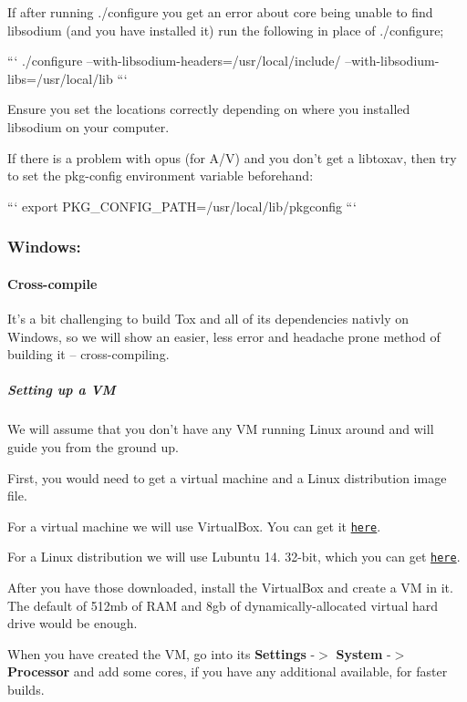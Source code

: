 If after running ./configure you get an error about core being unable to find libsodium (and you have installed it) run the following in place of ./configure;

``` ./configure --with-\/libsodium-\/headers=/usr/local/include/ --with-\/libsodium-\/libs=/usr/local/lib ```

Ensure you set the locations correctly depending on where you installed libsodium on your computer.

If there is a problem with opus (for A/\+V) and you don't get a libtoxav, then try to set the pkg-\/config environment variable beforehand\+:

``` export P\+K\+G\+\_\+\+C\+O\+N\+F\+I\+G\+\_\+\+P\+A\+T\+H=/usr/local/lib/pkgconfig ```

\label{_windows}%
 \subsubsection*{Windows\+:}

\label{_windows-cross-compile}%


\paragraph*{Cross-\/compile}

It's a bit challenging to build Tox and all of its dependencies nativly on Windows, so we will show an easier, less error and headache prone method of building it -- cross-\/compiling.

\label{_windows-cross-compile-vm}%
 \subparagraph*{Setting up a V\+M}

We will assume that you don't have any V\+M running Linux around and will guide you from the ground up.

First, you would need to get a virtual machine and a Linux distribution image file.

For a virtual machine we will use Virtual\+Box. You can get it \href{https://www.virtualbox.org/wiki/Downloads}{\tt here}.

For a Linux distribution we will use Lubuntu 14. 32-\/bit, which you can get \href{https://help.ubuntu.com/community/Lubuntu/GetLubuntu}{\tt here}.

After you have those downloaded, install the Virtual\+Box and create a V\+M in it. The default of 512mb of R\+A\+M and 8gb of dynamically-\/allocated virtual hard drive would be enough.

When you have created the V\+M, go into its {\bfseries Settings} -\/$>$ {\bfseries System} -\/$>$ {\bfseries Processor} and add some cores, if you have any additional available, for faster builds.

